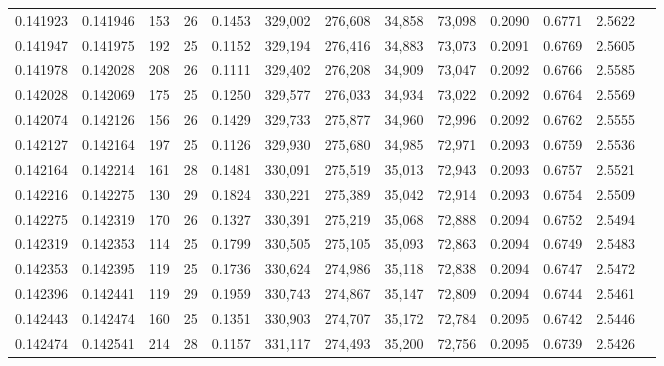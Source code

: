\begin{tabular}{rrrrrrrrrrrrr}
0.141923 & 0.141946 & 153 &  26 &                                     0.1453 & 329,002 & 276,608 &  34,858 &  73,098 & 0.2090 & 0.6771 & 2.5622 \\
0.141947 & 0.141975 & 192 &  25 &                                     0.1152 & 329,194 & 276,416 &  34,883 &  73,073 & 0.2091 & 0.6769 & 2.5605 \\
0.141978 & 0.142028 & 208 &  26 &                                     0.1111 & 329,402 & 276,208 &  34,909 &  73,047 & 0.2092 & 0.6766 & 2.5585 \\
0.142028 & 0.142069 & 175 &  25 &                                     0.1250 & 329,577 & 276,033 &  34,934 &  73,022 & 0.2092 & 0.6764 & 2.5569 \\
0.142074 & 0.142126 & 156 &  26 &                                     0.1429 & 329,733 & 275,877 &  34,960 &  72,996 & 0.2092 & 0.6762 & 2.5555 \\
0.142127 & 0.142164 & 197 &  25 &                                     0.1126 & 329,930 & 275,680 &  34,985 &  72,971 & 0.2093 & 0.6759 & 2.5536 \\
0.142164 & 0.142214 & 161 &  28 &                                     0.1481 & 330,091 & 275,519 &  35,013 &  72,943 & 0.2093 & 0.6757 & 2.5521 \\
0.142216 & 0.142275 & 130 &  29 &                                     0.1824 & 330,221 & 275,389 &  35,042 &  72,914 & 0.2093 & 0.6754 & 2.5509 \\
0.142275 & 0.142319 & 170 &  26 &                                     0.1327 & 330,391 & 275,219 &  35,068 &  72,888 & 0.2094 & 0.6752 & 2.5494 \\
0.142319 & 0.142353 & 114 &  25 &                                     0.1799 & 330,505 & 275,105 &  35,093 &  72,863 & 0.2094 & 0.6749 & 2.5483 \\
0.142353 & 0.142395 & 119 &  25 &                                     0.1736 & 330,624 & 274,986 &  35,118 &  72,838 & 0.2094 & 0.6747 & 2.5472 \\
0.142396 & 0.142441 & 119 &  29 &                                     0.1959 & 330,743 & 274,867 &  35,147 &  72,809 & 0.2094 & 0.6744 & 2.5461 \\
0.142443 & 0.142474 & 160 &  25 &                                     0.1351 & 330,903 & 274,707 &  35,172 &  72,784 & 0.2095 & 0.6742 & 2.5446 \\
0.142474 & 0.142541 & 214 &  28 &                                     0.1157 & 331,117 & 274,493 &  35,200 &  72,756 & 0.2095 & 0.6739 & 2.5426 \\

\end{tabular}
